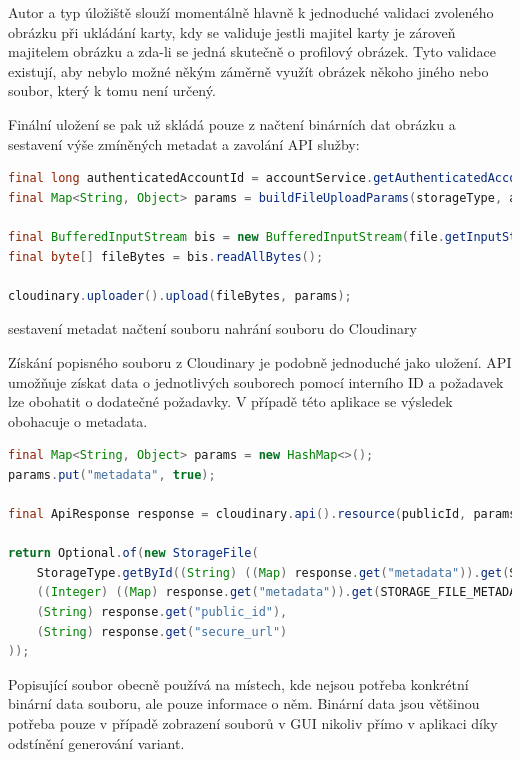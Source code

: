 		Autor a typ úložiště slouží momentálně hlavně k jednoduché validaci zvoleného obrázku při ukládání karty, kdy
		se validuje jestli majitel karty je zároveň majitelem obrázku a zda-li se jedná skutečně o profilový obrázek.
		Tyto validace existují, aby nebylo možné někým záměrně využít obrázek někoho jiného nebo soubor, který k tomu
		není určený.

		Finální uložení se pak už skládá pouze z načtení binárních dat obrázku a sestavení výše zmíněných metadat a zavolání \ac{API}
		služby:

		\begin{lstlisting}[language=Java]
final long authenticatedAccountId = accountService.getAuthenticatedAccount().getId();
final Map<String, Object> params = buildFileUploadParams(storageType, authenticatedAccountId);

final BufferedInputStream bis = new BufferedInputStream(file.getInputStream());
final byte[] fileBytes = bis.readAllBytes();

cloudinary.uploader().upload(fileBytes, params);
		\end{lstlisting}

		sestavení metadat
		načtení souboru
		nahrání souboru do Cloudinary

		Získání popisného souboru z Cloudinary je podobně jednoduché jako uložení.
		\ac{API} umožňuje získat data o jednotlivých souborech pomocí interního ID a požadavek lze obohatit o dodatečné požadavky.
		V případě této aplikace se výsledek obohacuje o metadata.

		\begin{lstlisting}[language=Java]
final Map<String, Object> params = new HashMap<>();
params.put("metadata", true);

final ApiResponse response = cloudinary.api().resource(publicId, params);

return Optional.of(new StorageFile(
	StorageType.getById((String) ((Map) response.get("metadata")).get(STORAGE_FILE_METADATA_STORAGE_TYPE_NAME)),
	((Integer) ((Map) response.get("metadata")).get(STORAGE_FILE_METADATA_OWNER_ID_NAME)).longValue(),
	(String) response.get("public_id"),
	(String) response.get("secure_url")
));
		\end{lstlisting}

		Popisující soubor obecně používá na místech, kde nejsou potřeba konkrétní binární data souboru, ale pouze
		informace o něm.
		Binární data jsou většinou potřeba pouze v případě zobrazení souborů v \ac{GUI} nikoliv přímo v aplikaci díky
		odstínění generování variant.

